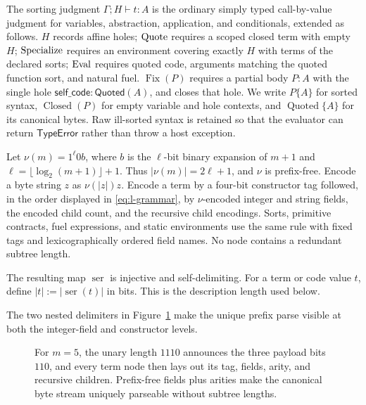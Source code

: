 The sorting judgment \(\Gamma;H\vdash t:A\) is the ordinary simply typed
call-by-value judgment for variables, abstraction, application, and
conditionals, extended as follows.  \(H\) records affine holes;
\(\operatorname{Quote}\) requires a scoped closed term with empty \(H\);
\(\operatorname{Specialize}\) requires an environment covering exactly \(H\) with terms of
the declared sorts; \(\operatorname{Eval}\) requires quoted code, arguments matching the
quoted function sort, and natural fuel.  \(\operatorname{Fix}(P)\) requires a partial body
\(P:A\) with the single hole
\(\mathsf{self\_code}:\mathsf{Quoted}(A)\), and closes that hole.  We write
\(P\{A\}\) for sorted syntax, \(\operatorname{Closed}(P)\) for empty variable
and hole contexts, and \(\operatorname{Quoted}\{A\}\) for its canonical bytes.
Raw ill-sorted syntax is retained so that the evaluator can return
\(\mathsf{TypeError}\) rather than throw a host exception.

\begin{definition}
\label{def:l-serialization}
Let \(\nu(m)=1^\ell0b\), where \(b\) is the \(\ell\)-bit binary expansion of
\(m+1\) and \(\ell=\lfloor\log_2(m+1)\rfloor+1\).  Thus
\(|\nu(m)|=2\ell+1\), and \(\nu\) is prefix-free.  Encode a byte string \(z\)
as \(\nu(|z|)z\).  Encode a term by a four-bit constructor tag followed, in
the order displayed in \eqref{eq:l-grammar}, by \(\nu\)-encoded integer and
string fields, the encoded child count, and the recursive child encodings.
Sorts, primitive contracts, fuel expressions, and static environments use the
same rule with fixed tags and lexicographically ordered field names.  No node
contains a redundant subtree length.

The resulting map \(\operatorname{ser}\) is injective and self-delimiting.
For a term or code value \(t\), define \(|t|:=|\operatorname{ser}(t)|\) in
bits.  This is the description length used below.
\end{definition}

The two nested delimiters in Figure~\ref{fig:serialization} make the unique
prefix parse visible at both the integer-field and constructor levels.
\begin{figure}[t]
\centering

\caption{For \(m=5\), the unary length \(1110\) announces the three payload bits \(110\), and every term node then lays out its tag, fields, arity, and recursive children.  Prefix-free fields plus arities make the canonical byte stream uniquely parseable without subtree lengths.}
\label{fig:serialization}
\end{figure}


